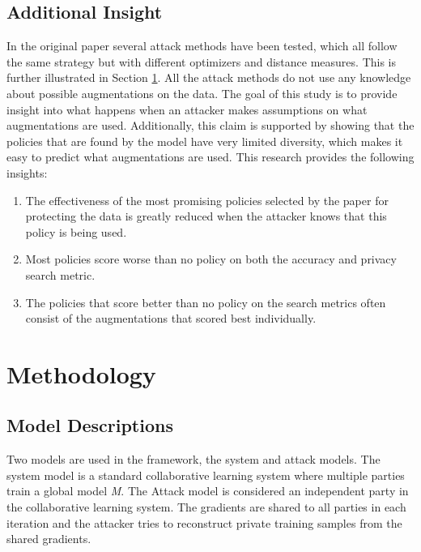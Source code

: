 \subsection{Additional Insight}
In the original paper several attack methods have been tested, which all follow the same strategy but with different optimizers and distance measures. This is further illustrated in Section \ref{sec:method}. All the attack methods do not use any knowledge about possible augmentations on the data. The goal of this study is to provide insight into what happens when an attacker makes assumptions on what augmentations are used. Additionally, this claim is supported by showing that the policies that are found by the model have very limited diversity, which makes it easy to predict what augmentations are used. This research provides the following insights:
\begin{enumerate}
    \item The effectiveness of the most promising policies selected by the paper for protecting the data is greatly reduced when the attacker knows that this policy is being used.
    \item Most policies score worse than no policy on both the accuracy and privacy search metric.
    \item The policies that score better than no policy on the search metrics often consist of the augmentations that scored best individually.
\end{enumerate}



\section{Methodology} \label{sec:method}

\subsection{Model Descriptions}
Two models are used in the framework, the system and attack models. The system model is a standard collaborative learning system where multiple parties train a global model \textit{M}. The Attack model is considered an independent party in the collaborative learning system. The gradients are shared to all parties in each iteration and the attacker tries to reconstruct private training samples from the shared gradients.

